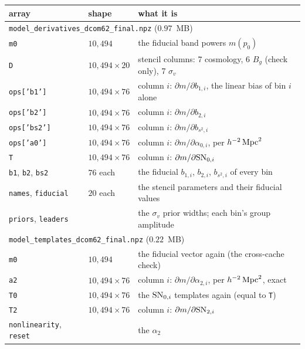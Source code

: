 \documentclass[11pt]{article}
\newcommand{\SNzi}{{\rm SN}_{0,i}}
\newcommand{\SNti}{{\rm SN}_{2,i}}
\newcommand{\us}{\_\allowbreak}
\begin{document}
\begin{table}[tbp]
  \centering
  \small
  \begin{tabular}{lll}
    \hline
    array & shape & what it is \\
    \hline
    \multicolumn{3}{l}{\texttt{model\us derivatives\us dcom62\us final.npz}
      ($0.97$~MB)} \\
    \texttt{m0} & $10{,}494$ & the fiducial band powers $m(p_0)$ \\
    \texttt{D} & $10{,}494 \times 20$ & stencil columns: 7 cosmology,
      6 $B_g$ (check only), 7 $\sigma_v$ \\
    \texttt{ops['b1']} & $10{,}494 \times 76$ & column $i$: $\partial m/\partial b_{1,i}$,
      the linear bias of bin $i$ alone \\
    \texttt{ops['b2']} & $10{,}494 \times 76$ & column $i$: $\partial m/\partial b_{2,i}$ \\
    \texttt{ops['bs2']} & $10{,}494 \times 76$ & column $i$: $\partial m/\partial b_{s^2,i}$ \\
    \texttt{ops['a0']} & $10{,}494 \times 76$ & column $i$: $\partial m/\partial \alpha_{0,i}$,
      per $h^{-2}\,{\rm Mpc}^2$ \\
    \texttt{T} & $10{,}494 \times 76$ & column $i$: $\partial m/\partial \SNzi$ \\
    \texttt{b1}, \texttt{b2}, \texttt{bs2} & $76$ each & the fiducial
      $b_{1,i}$, $b_{2,i}$, $b_{s^2,i}$ of every bin \\
    \texttt{names}, \texttt{fiducial} & $20$ each & the stencil parameters
      and their fiducial values \\
    \texttt{priors}, \texttt{leaders} & & the $\sigma_v$ prior widths;
      each bin's group amplitude \\
    \multicolumn{3}{l}{\texttt{model\us templates\us dcom62\us final.npz}
      ($0.22$~MB)} \\
    \texttt{m0} & $10{,}494$ & the fiducial vector again (the
      cross-cache check) \\
    \texttt{a2} & $10{,}494 \times 76$ & column $i$: $\partial m/\partial \alpha_{2,i}$,
      per $h^{-2}\,{\rm Mpc}^2$, exact \\
    \texttt{T0} & $10{,}494 \times 76$ & the $\SNzi$ templates again
      (equal to \texttt{T}) \\
    \texttt{T2} & $10{,}494 \times 76$ & column $i$: $\partial m/\partial \SNti$ \\
    \texttt{nonlinearity}, \texttt{reset} & & the $\alpha_2$

\end{tabular}
\end{table}
\end{document}
